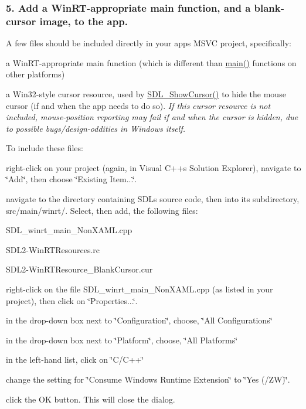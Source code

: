\subsubsection*{5. Add a Win\+R\+T-\/appropriate main function, and a blank-\/cursor image, to the app.}

A few files should be included directly in your app\textquotesingle{}s M\+S\+VC project, specifically\+:
\begin{DoxyEnumerate}
\item a Win\+R\+T-\/appropriate main function (which is different than \mbox{\hyperlink{_c_make_c_compiler_id_8c_a0ddf1224851353fc92bfbff6f499fa97}{main()}} functions on other platforms)
\item a Win32-\/style cursor resource, used by \mbox{\hyperlink{_s_d_l__mouse_8h_a00286ec15cd56dee1fd71ed4e6e7a585}{S\+D\+L\+\_\+\+Show\+Cursor()}} to hide the mouse cursor (if and when the app needs to do so). {\itshape If this cursor resource is not included, mouse-\/position reporting may fail if and when the cursor is hidden, due to possible bugs/design-\/oddities in Windows itself.}
\end{DoxyEnumerate}

To include these files\+:


\begin{DoxyEnumerate}
\item right-\/click on your project (again, in Visual C++\textquotesingle{}s Solution Explorer), navigate to \char`\"{}\+Add\char`\"{}, then choose \char`\"{}\+Existing Item...\char`\"{}.
\item navigate to the directory containing S\+DL\textquotesingle{}s source code, then into its subdirectory, \textquotesingle{}src/main/winrt/\textquotesingle{}. Select, then add, the following files\+:
\begin{DoxyItemize}
\item {\ttfamily S\+D\+L\+\_\+winrt\+\_\+main\+\_\+\+Non\+X\+A\+M\+L.\+cpp}
\item {\ttfamily S\+D\+L2-\/\+Win\+R\+T\+Resources.\+rc}
\item {\ttfamily S\+D\+L2-\/\+Win\+R\+T\+Resource\+\_\+\+Blank\+Cursor.\+cur}
\end{DoxyItemize}
\item right-\/click on the file {\ttfamily S\+D\+L\+\_\+winrt\+\_\+main\+\_\+\+Non\+X\+A\+M\+L.\+cpp} (as listed in your project), then click on \char`\"{}\+Properties...\char`\"{}.
\item in the drop-\/down box next to \char`\"{}\+Configuration\char`\"{}, choose, \char`\"{}\+All Configurations\char`\"{}
\item in the drop-\/down box next to \char`\"{}\+Platform\char`\"{}, choose, \char`\"{}\+All Platforms\char`\"{}
\item in the left-\/hand list, click on \char`\"{}\+C/\+C++\char`\"{}
\item change the setting for \char`\"{}\+Consume Windows Runtime Extension\char`\"{} to \char`\"{}\+Yes (/\+Z\+W)\char`\"{}.
\item click the OK button. This will close the dialog.
\end{DoxyEnumerate}

